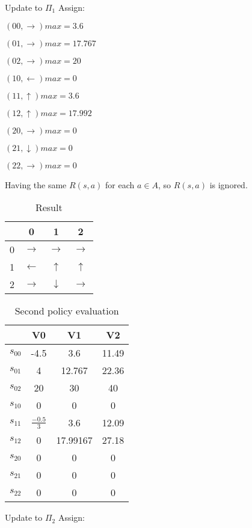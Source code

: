 \documentclass[12pt]{amsart}
\begin{document}
Update to $\Pi_{1}$ Assign:

$(00,\rightarrow) max=3.6$

$(01,\rightarrow) max=17.767$

$(02,\rightarrow) max=20$ 

$(10,\leftarrow) max=0$

$(11,\uparrow) max=3.6$

$(12,\uparrow) max=17.992$

$(20,\rightarrow) max=0$

$(21,\downarrow) max=0$

$(22,\rightarrow) max=0$

Having the same $R(s,a)$ for each $a \in A$, so $R(s,a)$ is ignored.

\begin{table}[!hbp]
\begin{tabular}{|c|c|c|c|}
\hline
\hline
 & 0 & 1 & 2  \\
\hline
0 & $\rightarrow$ & $\rightarrow$ & $\rightarrow$  \\
\hline
1 & $\leftarrow$ & $\uparrow$ & $\uparrow$  \\
\hline
2 & $\rightarrow$ & $\downarrow$ & $\rightarrow$  \\
\hline
\end{tabular}
\caption{Result}
\end{table} 

\begin{table}[!hbp]
\begin{tabular}{|c|c|c|c|}
\hline
\hline
 & V0 & V1 & V2  \\
\hline
$s_{00}$ & -4.5 & 3.6 & 11.49  \\
\hline
$s_{01}$ & 4 & 12.767 & 22.36  \\
\hline
$s_{02}$ & 20 & 30 & 40  \\
\hline
$s_{10}$ & 0 & 0 & 0 \\
\hline
$s_{11}$ & $\frac{-0.5}{3}$ & 3.6 & 12.09 \\
\hline
$s_{12}$ & 0 & 17.99167 & 27.18  \\
\hline
$s_{20}$ & 0 & 0 & 0  \\
\hline
$s_{21}$ & 0 & 0 & 0  \\
\hline
$s_{22}$ & 0 & 0 & 0 \\
\hline
\end{tabular}
\caption{Second policy evaluation}
\end{table} 

Update to $\Pi_{2}$ Assign:
\end{document}
